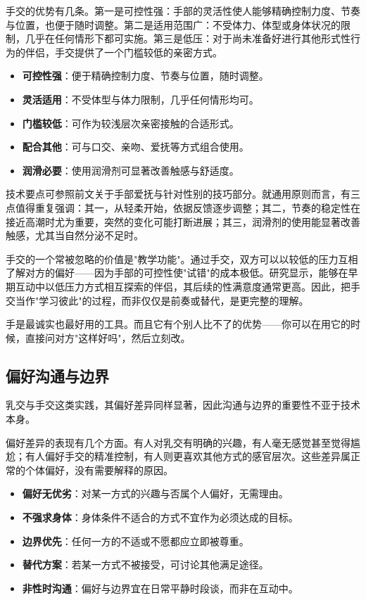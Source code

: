\documentclass[12pt,UTF8]{ctexbook}
\newcommand{\keyword}[1]{\textbf{#1}}
\begin{document}
手交的优势有几条。第一是可控性强：手部的灵活性使人能够精确控制力度、节奏与位置，也便于随时调整。第二是适用范围广：不受体力、体型或身体状况的限制，几乎在任何情形下都可实施。第三是低压：对于尚未准备好进行其他形式性行为的伴侣，手交提供了一个门槛较低的亲密方式。

\begin{itemize}
	\item \keyword{可控性强}：便于精确控制力度、节奏与位置，随时调整。
	\item \keyword{灵活适用}：不受体型与体力限制，几乎任何情形均可。
	\item \keyword{门槛较低}：可作为较浅层次亲密接触的合适形式。
	\item \keyword{配合其他}：可与口交、亲吻、爱抚等方式组合使用。
	\item \keyword{润滑必要}：使用润滑剂可显著改善触感与舒适度。
\end{itemize}

技术要点可参照前文关于手部爱抚与针对性别的技巧部分。就通用原则而言，有三点值得重复强调：其一，从轻柔开始，依据反馈逐步调整；其二，节奏的稳定性在接近高潮时尤为重要，突然的变化可能打断进展；其三，润滑剂的使用能显著改善触感，尤其当自然分泌不足时。

手交的一个常被忽略的价值是"教学功能"。通过手交，双方可以以较低的压力互相了解对方的偏好——因为手部的可控性使"试错"的成本极低。研究显示，能够在早期互动中以低压力方式相互探索的伴侣，其后续的性满意度通常更高。因此，把手交当作"学习彼此"的过程，而非仅仅是前奏或替代，是更完整的理解。

\begin{tcolorbox}[colback=pink!5!white,colframe=red!50!black,title=贴心小叮咛]
	手是最诚实也最好用的工具。而且它有个别人比不了的优势——你可以在用它的时候，直接问对方"这样好吗"，然后立刻改。
\end{tcolorbox}
\subsection{偏好沟通与边界}

乳交与手交这类实践，其偏好差异同样显著，因此沟通与边界的重要性不亚于技术本身。

偏好差异的表现有几个方面。有人对乳交有明确的兴趣，有人毫无感觉甚至觉得尴尬；有人偏好手交的精准控制，有人则更喜欢其他方式的感官层次。这些差异属正常的个体偏好，没有需要解释的原因。

\begin{itemize}
	\item \keyword{偏好无优劣}：对某一方式的兴趣与否属个人偏好，无需理由。
	\item \keyword{不强求身体}：身体条件不适合的方式不宜作为必须达成的目标。
	\item \keyword{边界优先}：任何一方的不适或不愿都应立即被尊重。
	\item \keyword{替代方案}：若某一方式不被接受，可讨论其他满足途径。
	\item \keyword{非性时沟通}：偏好与边界宜在日常平静时段谈，而非在互动中。
\end{itemize}
\end{document}
